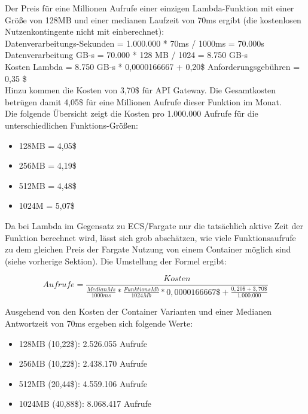 Der Preis für eine Millionen Aufrufe einer einzigen Lambda-Funktion mit einer Größe von 128MB und einer medianen Laufzeit von 70ms ergibt (die kostenlosen Nutzenkontingente nicht mit einberechnet): \\

Datenverarbeitungs-Sekunden = 1.000.000 * 70ms / 1000ms = 70.000s   \\
Datenverarbeitung GB-s = 70.000 * 128 MB / 1024 = 8.750 GB-s    \\
Kosten Lambda = 8.750 GB-s * 0,0000166667 + 0,20\$ Anforderungsgebühren = 0,35 \$     \\

Hinzu kommen die Kosten von 3,70\$ für API Gateway. Die Gesamtkosten betrügen damit 4,05\$ für eine Millionen Aufrufe dieser Funktion im Monat.    \\

Die folgende Übersicht zeigt die Kosten pro 1.000.000 Aufrufe für die unterschiedlichen Funktions-Größen:
\begin{itemize}
    \item 128MB = 4,05\$
    \item 256MB = 4,19\$
    \item 512MB = 4,48\$
    \item 1024M = 5,07\$
\end{itemize}

Da bei Lambda im  Gegensatz zu ECS/Fargate nur die tatsächlich aktive Zeit der Funktion berechnet wird, lässt sich grob abschätzen, wie viele Funktionsaufrufe zu dem gleichen Preis der Fargate Nutzung von einem Container möglich sind (siehe vorherige Sektion). Die Umstellung der Formel ergibt:

\begin{equation}
Aufrufe = \frac{Kosten}{\frac{MedianMs}{1000ms} * \frac{FunktionsMb}{1024Mb} * 0,0000166667\$ + \frac{0,20\$ + 3,70\$}{1.000.000}}
\end{equation}

Ausgehend von den Kosten der Container Varianten und einer Medianen Antwortzeit von 70ms ergeben sich folgende Werte: 

\begin{itemize}
    \item 128MB (10,22\$): 2.526.055 Aufrufe
    \item 256MB (10,22\$): 2.438.170 Aufrufe
    \item 512MB (20,44\$): 4.559.106 Aufrufe
    \item 1024MB (40,88\$): 8.068.417 Aufrufe
\end{itemize}